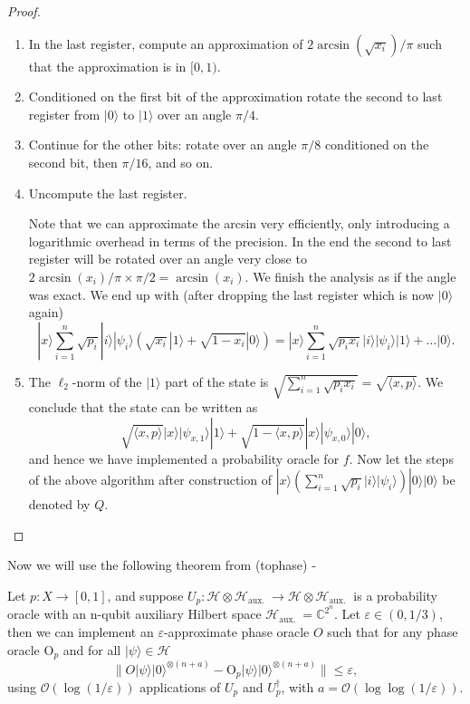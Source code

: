 \begin{flushleft}
\begin{flushleft}
\begin{proof}
\begin{enumerate}
\item  In the last register, compute an approximation of $2 \arcsin \left(\sqrt{x_i}\right) / \pi$ such that the approximation is in $[0,1)$.
\item  Conditioned on the first bit of the approximation rotate the second to last register from $|0\rangle$ to $|1\rangle$ over an angle $\pi / 4$.
\item Continue for the other bits: rotate over an angle $\pi / 8$ conditioned on the second bit, then $\pi / 16$, and so on.
\item Uncompute the last register.

Note that we can approximate the arcsin very efficiently, only introducing a logarithmic overhead in terms of the precision. In the end the second to last register will be rotated over an angle very close to $2 \arcsin \left(x_i\right) / \pi \times \pi / 2=\arcsin \left(x_i\right)$. We finish the analysis as if the angle was exact. We end up with (after dropping the last register which is now $|0\rangle$ again)
$$
|x\rangle \sum_{i=1}^n \sqrt{p_i}|i\rangle |\psi_i\rangle(\sqrt{x_i}|1\rangle+\sqrt{1-x_i}|0\rangle)=|x\rangle \sum_{i=1}^n \sqrt{p_i x_i}|i\rangle| \psi_i\rangle|1\rangle+\ldots|0\rangle .
$$
\item The $\ell_2$-norm of the $|1\rangle$ part of the state is $\sqrt{\sum_{i=1}^n \sqrt{p_i x_i}}=\sqrt{\langle x, p\rangle}$. We conclude that the state can be written as
$$
\sqrt{\langle x, p\rangle}|x\rangle|\psi_{x, 1}\rangle| 1\rangle+\sqrt{1-\langle x, p\rangle}|x\rangle|\psi_{x, 0}\rangle| 0\rangle,
$$
and hence we have implemented a probability oracle for $f$.
Now let the steps of the above algorithm after construction of $|x\rangle (\sum_{i=1}^n \sqrt{p_i}|i\rangle|\psi_i\rangle)|0\rangle| 0 \rangle 
$ be denoted by $Q$.
\end{enumerate}
\end{proof}
\break
Now we will use the following theorem from (tophase) -
\begin{theorem}
	Let $p: X \rightarrow[0,1]$, and suppose $U_p: \mathcal{H} \otimes \mathcal{H}_{\text {aux. }} \rightarrow \mathcal{H} \otimes \mathcal{H}_{\text {aux. }}$ is a probability oracle with an n-qubit auxiliary Hilbert space $\mathcal{H}_{\text {aux. }}=\mathbb{C}^{2^n}$. Let $\varepsilon \in(0,1 / 3)$, then we can implement an $\varepsilon$-approximate phase oracle $O$ such that for any phase oracle $\mathrm{O}_p$ and for all $|\psi\rangle \in \mathcal{H}$
	$$
	\| O|\psi\rangle|0\rangle^{\otimes(n+a)}-\mathrm{O}_p|\psi\rangle|0\rangle^{\otimes(n+a)} \| \leq \varepsilon,
	$$
	using $\mathcal{O}(\log (1 / \varepsilon))$ applications of $U_p$ and $U_p^{\dagger}$, with $a=\mathcal{O}(\log \log (1 / \varepsilon))$.
	

\end{theorem}
\end{flushleft}
\end{flushleft}
